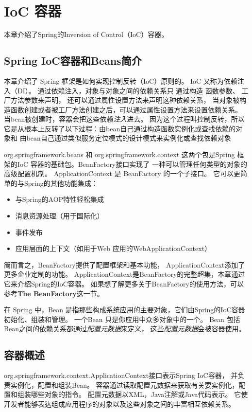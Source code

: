 
\chapter{IoC 容器}
本章介绍了Spring的Inversion of Control（IoC）容器。

\section{Spring IoC容器和Beans简介}
本章介绍了 Spring 框架是如何实现控制反转（IoC）原则的。
IoC 又称为依赖注入（DI）。
通过依赖注入，对象与对象之间的依赖关系只
通过构造
函数参数、
工厂方法参数来声明，
还可以通过属性设置方法来声明这种依赖关系，
当对象被构造函数创建或者被工厂方法创建之后，可以通过属性设置方法来设置依赖关系。
当bean被创建时，容器会把这些依赖\textit{注入}进去。
因为这个过程叫控制反转，所以它是从根本上反转了以下过程：由bean自己通过构造函数实例化或查找依赖的对象和
由bean自己通过类似服务定位模式的设计模式来实例化或查找依赖对象

org.springframework.beans 和 org.springframework.context 
这两个包是Spring 框架的IoC 容器的基础包。BeanFactory接口实现了
一种可以管理任何类型的对象的高级配置机制。
ApplicationContext 是 BeanFactory 的一个子接口。
它可以更简单的与Spring的其他功能集成：

\begin{itemize}
    \item 与Spring的AOP特性轻松集成
    \item 消息资源处理（用于国际化）
    \item 事件发布
    \item 应用层面的上下文（如用于Web 应用的WebApplicationContext）
\end{itemize}

简而言之，BeanFactory提供了配置框架和基本功能，
ApplicationContext添加了更多企业定制的功能。
ApplicationContext是BeanFactory的完整超集，本章通过它来介绍Spring的IoC容器。
如果想了解更多关于BeanFactory的使用方法，可以参考\textbf{The BeanFactory}这一节。

在 Spring 中，Bean 是指那些构成系统应用的主要对象，它们由Spring的IoC容器初始化、组装和管理。
一个Bean 只是你应用中众多对象中的一个。
Bean 包括 Bean之间的依赖关系都通过\textit{配置元数据}来定义，
这些\textit{配置元数据}会被容器使用。

\section{容器概述}
org.springframework.context.ApplicationContext接口表示Spring IoC容器，
并负责实例化，配置和组装Bean。 
容器通过读取配置元数据来获取有关要实例化，配置和组装哪些对象的指令。 
配置元数据以XML，Java注解或Java代码表示。 
它使开发者能够表达组成应用程序的对象以及这些对象之间的丰富相互依赖关系。

